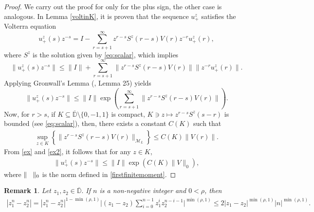 \documentclass[12pt,oneside,onecolumn,open]{article}
\newtheorem{obs}[teo]{Remark}
\begin{document}
\begin{proof} We  carry out the proof for only for the plus sign, the other case is analogous.
    In   Lemma \ref{voltinK}, it is proven that the sequence \(u_+^{z}\) satisfies the Volterra equation
    \begin{equation}
        u_{+}^{z}(s) z^{-s} = I - \sum_{r=s+1}^{\infty} z^{r-s} S^{z}(r-s) V(r) z^{-r} u_{+}^{z}(r),
    \end{equation}
  where $S^z$ is the solution given by \eqref{eq:scalar},
which implies
    \begin{equation}
        \| u_{+}^{z}(s) z^{-s} \|\leq \| I \| + \sum_{r=s+1}^{\infty} \| z^{r-s} S^{z}(r-s) V(r) \| \| z^{-r} u_{+}^{z}(r) \|.
    \end{equation}
    Applying Gronwall's Lemma (\cite{MR4760547}, Lemma 25) yields
    \begin{equation}\label{ex}
        \| u_{+}^{z}(s) z^{-s} \| \leq \| I \| \exp\left( \sum_{r=s+1}^{\infty}\| z^{r-s} S^{z}(r-s) V(r) \| \right).
    \end{equation}
Now, for \(r > s\), if \(K \subseteq \overline{\mathbb{D}} \setminus \{0, -1, 1\}\) is compact, $K\ni z\mapsto z^{r-s} S^{z}(s-r)$ is bounded (see \eqref{eq:scalar}), then, there exists a constant \(C(K)\) such that
    \begin{align}\label{ex2}
        \sup_{z \in K} \left\{ \| z^{r-s} S^{z}(r-s) V(r) \|_{\mathcal{M}_L} \right\} \leq C(K) \| V(r) \| .
    \end{align}
From \eqref{ex} and \eqref{ex2}, it follows that for  any \(z \in K\),
    \begin{align}
        \| u_+^{z}(s) z^{-s} \| \leq \| I \|  \exp\left( C(K) \| V \|_0 \right),
    \end{align}
    where $\|\hspace{.3cm}\|_0$ is the norm defined in \eqref{firstfinitemoment}.
\end{proof}
\begin{obs}\label{IQ}
    Let $z_{1}, z_{2}\in \overline{\mathbb{D}}.$ If $n$ is a non-negative integer and $0<\rho $, then 
    \begin{align}
        |z_{1}^{n}-z_{2}^{n}|   = |z_{1}^{n}-z_{2}^{n}|^{1-\min(\rho, 1)} \Big | (z_1 - z_2) \sum_{i = 0}^{n-1} z_1^i  z_2^{n-i-1} \Big |^{\min(\rho,1)} 
        \leq 2|z_1 -z_2|^{\min(\rho, 1) }|n|^{\min(\rho, 1) }.
    \end{align}
\end{obs}
\end{document}
